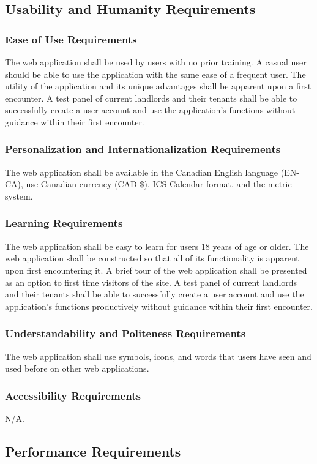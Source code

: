 \documentclass[12pt]{article}
\begin{document}
{{{{{{{\subsection{Usability and Humanity Requirements}
\subsubsection{Ease of Use Requirements}
The 
web application shall be used by users with no prior training. A casual user should 
be able to use the application with the same ease of a frequent user. The 
utility of the application and its unique advantages shall be apparent upon a first encounter. A test panel of current 
landlords and their tenants shall be able to successfully create a user account 
and use the application's functions without guidance within their first 
encounter.
\subsubsection{Personalization and Internationalization Requirements}
The web application shall be available in the Canadian English language (EN-CA),  use 
Canadian currency (CAD \$), ICS Calendar format, and the metric system.
\subsubsection{Learning Requirements}
The web application shall be easy to learn for users 18 years of age or older. The web 
application shall be constructed so that all of its functionality is apparent 
upon first encountering it. A brief tour of the web application shall be 
presented as an option to first time visitors of the site. A test panel of 
current landlords and their tenants shall be able to successfully create a user 
account and use the application's functions productively without guidance within 
their first encounter.
\subsubsection{Understandability and Politeness Requirements}
The web application shall use symbols, icons, and words that users have seen and used before on other web applications.
\subsubsection{Accessibility Requirements}
N/A.
\subsection{Performance Requirements}
}}}}}}}
\end{document}
